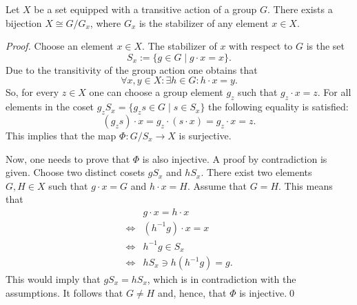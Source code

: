 
    \begin{property}\label{group:transitive_action_property}
        Let $X$ be a set equipped with a transitive action of a group $G$. There exists a bijection $X\cong G/G_x$, where $G_x$ is the stabilizer of any element $x\in X$.\\
        \begin{mdframed}[roundcorner=10pt, linecolor=blue, linewidth=1pt]
            \begin{proof}
                Choose an element $x\in X$. The stabilizer of $x$ with respect to $G$ is the set \[S_x := \{g\in G\mid g\cdot x = x\}.\] Due to the transitivity of the group action one obtains that \[\forall x, y\in X: \exists h\in G: h\cdot x = y.\] So, for every $z\in X$ one can choose a group element $g_z$ such that $g_z\cdot x = z$. For all elements in the coset $g_zS_x = \{g_zs\in G\mid s\in S_x\}$ the following equality is satisfied: \[(g_zs)\cdot x = g_z\cdot (s\cdot x) = g_z\cdot x = z.\] This implies that the map $\Phi:G/S_x \rightarrow X$ is surjective.

                Now, one needs to prove that $\Phi$ is also injective. A proof by contradiction is given. Choose two distinct cosets $gS_x$ and $hS_x$. There exist two elements $G,H\in X$ such that $g\cdot x = G$ and $h\cdot x = H$. Assume that $G = H$. This means that
                \begin{align*}
                    &g\cdot x = h\cdot x\\
                    \iff&(h^{-1}g)\cdot x = x\\
                    \iff&h^{-1}g\in S_x\\
                    \iff&hS_x\ni h(h^{-1}g) = g.
                \end{align*}
                This would imply that $gS_x = hS_x$, which is in contradiction with the assumptions. It follows that $G\neq H$ and, hence, that $\Phi$ is injective.\qed
            \end{proof}
        \end{mdframed}
    \end{property}

